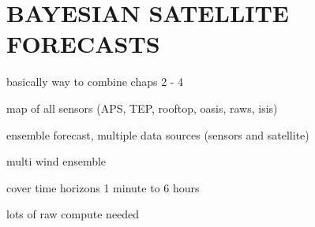 \chapter{BAYESIAN SATELLITE FORECASTS}
\label{chap:satfx}

basically way to combine chaps 2 - 4

map of all sensors (APS, TEP, rooftop, oasis, raws, isis)

ensemble forecast, multiple data sources (sensors and satellite)

multi wind ensemble

cover time horizons 1 minute to 6 hours

lots of raw compute needed

